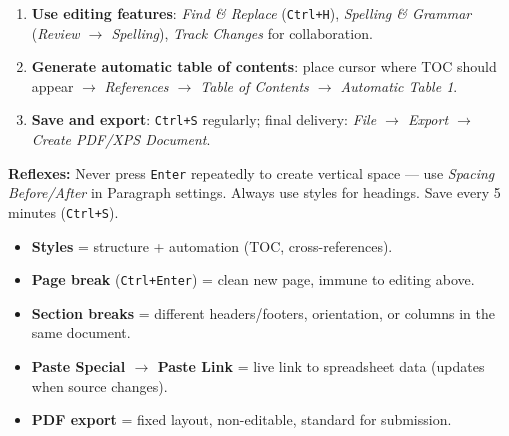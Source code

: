 \documentclass[11pt]{article}
\begin{document}
\begin{methode}
\begin{enumerate}
\begin{itemize}
\item Headers/Footers: \emph{Insert $\rightarrow$ Header/Footer} $\rightarrow$ type name, date, document code.
\item Footnotes/Endnotes: \emph{References $\rightarrow$ Insert Footnote}.
\item Page breaks: \texttt{Ctrl+Enter} (never multiple \texttt{Enter} keys).
\end{itemize}
\item \textbf{Use editing features}: \emph{Find \& Replace} (\texttt{Ctrl+H}), \emph{Spelling \& Grammar} (\emph{Review $\rightarrow$ Spelling}), \emph{Track Changes} for collaboration.
\item \textbf{Generate automatic table of contents}: place cursor where TOC should appear $\rightarrow$ \emph{References $\rightarrow$ Table of Contents $\rightarrow$ Automatic Table 1}.
\item \textbf{Save and export}: \texttt{Ctrl+S} regularly; final delivery: \emph{File $\rightarrow$ Export $\rightarrow$ Create PDF/XPS Document}.
\end{enumerate}
\textbf{Reflexes:} Never press \texttt{Enter} repeatedly to create vertical space --- use \emph{Spacing Before/After} in Paragraph settings. Always use styles for headings. Save every 5 minutes (\texttt{Ctrl+S}).
\end{methode}

\begin{aretenir}
\begin{itemize}
\item \textbf{Styles} = structure + automation (TOC, cross-references).
\item \textbf{Page break} (\texttt{Ctrl+Enter}) = clean new page, immune to editing above.
\item \textbf{Section breaks} = different headers/footers, orientation, or columns in the same document.
\item \textbf{Paste Special $\rightarrow$ Paste Link} = live link to spreadsheet data (updates when source changes).
\item \textbf{PDF export} = fixed layout, non-editable, standard for submission.
\end{itemize}
\end{aretenir}
\end{document}
